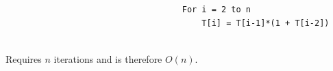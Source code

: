 \documentclass[10pt]{article}
\begin{document}
\begin{enumerate}
\begin{verbatim}
									For i = 2 to n
									    T[i] = T[i-1]*(1 + T[i-2])								
								\end{verbatim}
								\\
								Requires $n$ iterations and is therefore $O(n)$.
	\end{enumerate}
\end{document}
